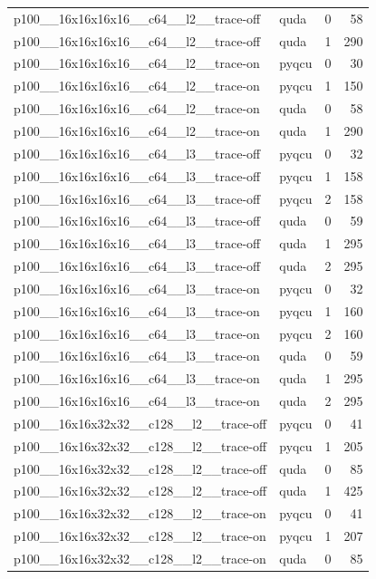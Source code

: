 \begin{table}[htbp]
\begin{tabular}{@{}llrr@{}}
p100\_\_16x16x16x16\_\_c64\_\_l2\_\_trace-off & quda & 0 & 58 \\
p100\_\_16x16x16x16\_\_c64\_\_l2\_\_trace-off & quda & 1 & 290 \\
p100\_\_16x16x16x16\_\_c64\_\_l2\_\_trace-on & pyqcu & 0 & 30 \\
p100\_\_16x16x16x16\_\_c64\_\_l2\_\_trace-on & pyqcu & 1 & 150 \\
p100\_\_16x16x16x16\_\_c64\_\_l2\_\_trace-on & quda & 0 & 58 \\
p100\_\_16x16x16x16\_\_c64\_\_l2\_\_trace-on & quda & 1 & 290 \\
p100\_\_16x16x16x16\_\_c64\_\_l3\_\_trace-off & pyqcu & 0 & 32 \\
p100\_\_16x16x16x16\_\_c64\_\_l3\_\_trace-off & pyqcu & 1 & 158 \\
p100\_\_16x16x16x16\_\_c64\_\_l3\_\_trace-off & pyqcu & 2 & 158 \\
p100\_\_16x16x16x16\_\_c64\_\_l3\_\_trace-off & quda & 0 & 59 \\
p100\_\_16x16x16x16\_\_c64\_\_l3\_\_trace-off & quda & 1 & 295 \\
p100\_\_16x16x16x16\_\_c64\_\_l3\_\_trace-off & quda & 2 & 295 \\
p100\_\_16x16x16x16\_\_c64\_\_l3\_\_trace-on & pyqcu & 0 & 32 \\
p100\_\_16x16x16x16\_\_c64\_\_l3\_\_trace-on & pyqcu & 1 & 160 \\
p100\_\_16x16x16x16\_\_c64\_\_l3\_\_trace-on & pyqcu & 2 & 160 \\
p100\_\_16x16x16x16\_\_c64\_\_l3\_\_trace-on & quda & 0 & 59 \\
p100\_\_16x16x16x16\_\_c64\_\_l3\_\_trace-on & quda & 1 & 295 \\
p100\_\_16x16x16x16\_\_c64\_\_l3\_\_trace-on & quda & 2 & 295 \\
p100\_\_16x16x32x32\_\_c128\_\_l2\_\_trace-off & pyqcu & 0 & 41 \\
p100\_\_16x16x32x32\_\_c128\_\_l2\_\_trace-off & pyqcu & 1 & 205 \\
p100\_\_16x16x32x32\_\_c128\_\_l2\_\_trace-off & quda & 0 & 85 \\
p100\_\_16x16x32x32\_\_c128\_\_l2\_\_trace-off & quda & 1 & 425 \\
p100\_\_16x16x32x32\_\_c128\_\_l2\_\_trace-on & pyqcu & 0 & 41 \\
p100\_\_16x16x32x32\_\_c128\_\_l2\_\_trace-on & pyqcu & 1 & 207 \\
p100\_\_16x16x32x32\_\_c128\_\_l2\_\_trace-on & quda & 0 & 85 \\

\end{tabular}
\end{table}
